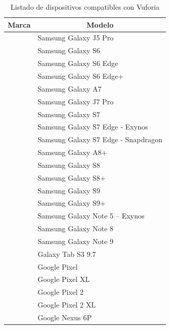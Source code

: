 \begin{table}[]
	\begin{tabular}{| p{4.5cm} | p{10.5cm} |}
		\hline \centering
		\textbf{Marca}              & \multicolumn{1}{c|}{\textbf{Modelo}}               \\ \hline \centering
\multirow{5}{*}{Samsumg}     & Samsung Galaxy J5 Pro                       \\ \cline{2-2} 														  
& Samsung Galaxy S6   \\ \cline{2-2}
& Samsung Galaxy S6 Edge   \\ \cline{2-2}
& Samsung Galaxy S6 Edge+   \\ \cline{2-2}
& Samsung Galaxy A7   \\ \cline{2-2}
& Samsung Galaxy J7 Pro   \\ \cline{2-2}
& Samsung Galaxy S7   \\ \cline{2-2}
& Samsung Galaxy S7 Edge - Exynos   \\ \cline{2-2}
& Samsung Galaxy S7 Edge - Snapdragon   \\ \cline{2-2}
& Samsung Galaxy A8+   \\ \cline{2-2}
& Samsung Galaxy S8   \\ \cline{2-2}
& Samsung Galaxy S8+   \\ \cline{2-2}
& Samsung Galaxy S9   \\ \cline{2-2}
& Samsung Galaxy S9+   \\ \cline{2-2}
& Samsung Galaxy Note 5 – Exynos   \\ \cline{2-2}
& Samsung Galaxy Note 8   \\ \cline{2-2}
& Samsung Galaxy Note 9    \\ \cline{2-2}
& Galaxy Tab S3 9.7  \\ \hline   \centering
\multirow{5}{*}{Google}    & Google Pixel              \\ \cline{2-2}
& Google Pixel XL   \\ \cline{2-2}
& Google Pixel 2   \\ \cline{2-2}
& Google Pixel 2 XL   \\ \cline{2-2}
& Google Nexus 6P    \\ \hline 
\end{tabular}
\captionsetup{justification=centering}
\caption{Listado de dispositivos compatibles con Vuforia}
\end{table}

\newpage
\noindent
